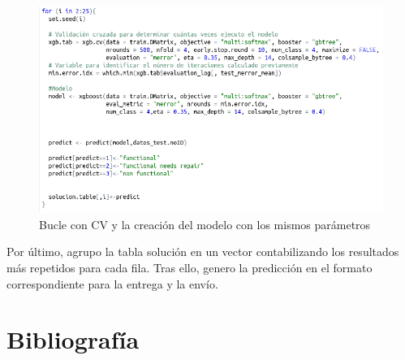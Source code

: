\begin{figure}[H] %
	\centering
	\includegraphics[scale=0.5]{modelo-ensemble.png}  %
	\caption{Bucle con CV y la creación del modelo con los mismos parámetros} 
	\label{fig:modelo}
\end{figure}

Por último, agrupo la tabla solución en un vector contabilizando los resultados más repetidos para cada fila. Tras ello, genero la predicción en el formato correspondiente para la entrega y la envío. 

\newpage
 
\section{Bibliografía}




